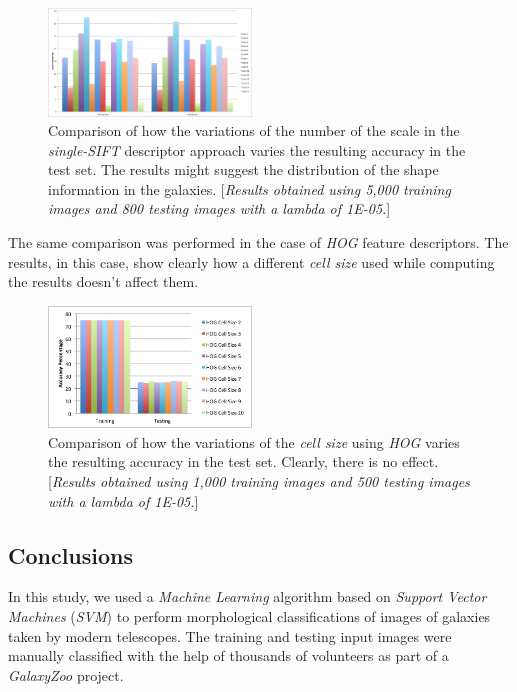 \documentclass{vldb}
\begin{document}
\begin{figure}[!ht]
    \centering
    \includegraphics[width=0.48\textwidth, trim=0 0 0 0, clip]{../Images/4_VaryingScaleSingleSIFT.png}
    \caption{Comparison of how the variations of the number of the scale in the \emph{single-SIFT} descriptor approach varies the resulting accuracy in the test set. The results might suggest the distribution of the shape information in the galaxies. [\emph{Results obtained using 5,000 training images and 800 testing images with a \emph{lambda} of 1E-05.}]}
\end{figure}
\FloatBarrier

The same comparison was performed in the case of \emph{HOG} feature descriptors. The results, in this case, show clearly how a different \emph{cell size} used while computing the results doesn't affect them.

\begin{figure}[!ht]
    \centering
    \includegraphics[width=0.48\textwidth, trim=0 0 0 0, clip]{../Images/5_ChangingHOGSize.png}
    \caption{Comparison of how the variations of the \emph{cell size} using \emph{HOG} varies the resulting accuracy in the test set. Clearly, there is no effect. [\emph{Results obtained using 1,000 training images and 500 testing images with a \emph{lambda} of 1E-05.}]}
\end{figure}
\FloatBarrier

\subsection{Conclusions}
In this study, we used a \emph{Machine Learning} algorithm based on \emph{Support Vector Machines} (\emph{SVM}) to perform morphological classifications of images of galaxies taken by modern telescopes. The training and testing input images were manually classified with the help of thousands of volunteers as part of a \emph{GalaxyZoo} project. \\
\end{document}
